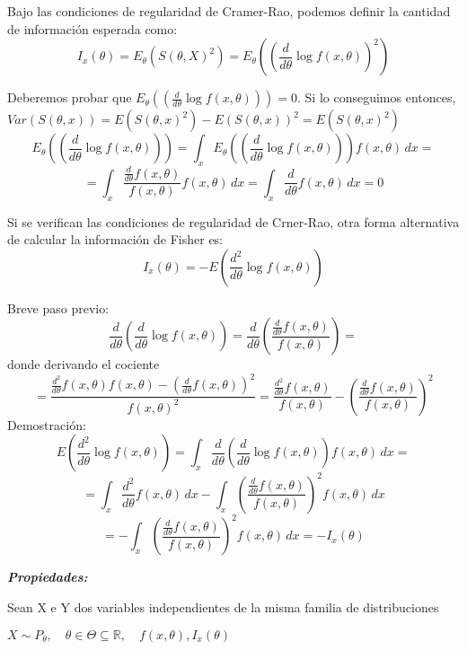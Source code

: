 Bajo las condiciones de regularidad de Cramer-Rao, podemos definir la cantidad
de información esperada como:
\[
    I_x(\theta)=E_\theta(S(\theta,X)^2)=E_\theta\left(\left(\frac{d}{d \theta} \log f(x,\theta)\right)^2\right)
\]

\begin{proofs}
    Deberemos probar que $E_\theta(\left(\frac{d}{d \theta} \log f(x,\theta)\right))=0$. Si lo conseguimos entonces, $Var(S(\theta,x))=E(S(\theta,x)^2)-E(S(\theta,x))^2=E(S(\theta,x)^2)$
    \[
        E_\theta\left(\left(\frac{d}{d \theta} \log f(x,\theta)\right)\right)=\int_{x} E_\theta\left(\left(\frac{d}{d \theta} \log f(x,\theta)\right)\right)  f(x,\theta) \,dx =
    \]
    \[
        =\int_{x} \frac{\frac{d}{d \theta} f(x,\theta)}{f(x,\theta)}  f(x,\theta) \,dx=\int_{x} \frac{d}{d \theta} f(x,\theta) \,dx = 0
    \]
\end{proofs}

Si se verifican las condiciones de regularidad de Crner-Rao, otra forma alternativa de calcular la información de Fisher es:
\[
    I_x(\theta)=-E\left(\frac{d^2}{d \theta} \log f(x,\theta)\right)
\]

\begin{proofs}
    Breve paso previo:
    \[
        \frac{d}{d \theta}\left(\frac{d}{d \theta} \log f(x,\theta)\right)=\frac{d}{d \theta}\left(\frac{\frac{d}{d \theta} f(x,\theta)}{f(x,\theta)}\right)=
    \]
    donde derivando el cociente
    \[
        =\frac{\frac{d^2}{d \theta} f(x,\theta) f(x,\theta) -\left(\frac{d}{d \theta} f(x,\theta)\right)^2}{f(x,\theta)^2}=\frac{\frac{d^2}{d \theta} f(x,\theta)}{f(x,\theta)} -\left(\frac{\frac{d}{d \theta} f(x,\theta)}{f(x,\theta)}\right)^2
    \]
    Demostración:
    \[
        E(\frac{d^2}{d \theta} \log f(x,\theta))=\int_{x} \frac{d}{d \theta}\left(\frac{d}{d \theta} \log f(x,\theta)\right)  f(x,\theta) \,dx =
    \]
    \[
        =\int_{x} \frac{d^2}{d \theta} f(x, \theta) \,dx - \int_{x}\left(\frac{\frac{d}{d \theta} f(x,\theta)}{f(x,\theta)}\right)^2  f(x,\theta) \,dx
    \]
    \[
        = -\int_{x}\left(\frac{\frac{d}{d \theta} f(x,\theta)}{f(x,\theta)}\right)^2  f(x,\theta) \,dx=-I_x(\theta)
    \]
\end{proofs}

\textbf{\textit{Propiedades:}}

Sean X e Y dos variables independientes de la misma familia de distribuciones

$X \sim P_\theta, \quad \theta \in \Theta \subseteq \mathbb{R}, \quad f(x,\theta), I_x(\theta)$

